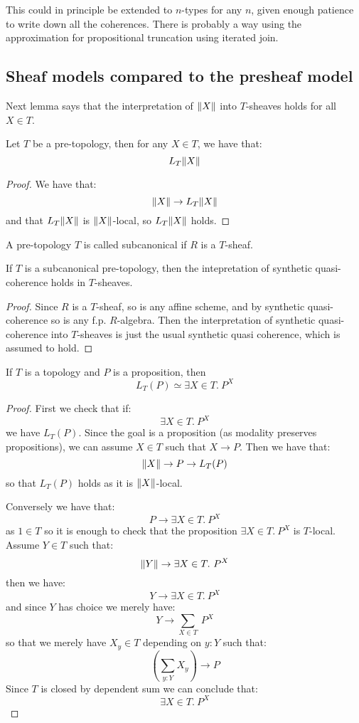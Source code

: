 This could in principle be extended to $n$-types for any $n$, given enough patience to write down all the coherences. There is probably a way using the approximation for propositional truncation using iterated join.

\subsection{Sheaf models compared to the presheaf model}

Next lemma says that the interpretation of $\lVert X \rVert$ into $T$-sheaves holds for all $X\in T$.

\begin{lemma}\label{sheaves-inhabited}
Let $T$ be a pre-topology, then for any $X\in T$, we have that:
\[L_T\lVert X \rVert\]
\end{lemma}

\begin{proof}
We have that: 
\[\lVert X \rVert\to L_T\lVert X \rVert\]
and that $L_T\lVert X \rVert$ is $\lVert X \rVert$-local, so $L_T\lVert X \rVert$ holds.
\end{proof}

\begin{definition}
A pre-topology $T$ is called subcanonical if $R$ is a $T$-sheaf.
\end{definition}

\begin{lemma}\label{sheaves-quasi-coherent}
If $T$ is a subcanonical pre-topology, then the intepretation of synthetic quasi-coherence holds in $T$-sheaves.
\end{lemma}

\begin{proof}
Since $R$ is a $T$-sheaf, so is any affine scheme, and by synthetic quasi-coherence so is any f.p. $R$-algebra. Then the interpretation of synthetic quasi-coherence into $T$-sheaves is just the usual synthetic quasi coherence, which is assumed to hold.
\end{proof}

\begin{lemma}\label{sheaf-replacement-proposition}
If $T$ is a topology and $P$ is a proposition, then 
\[L_T(P) \simeq \exists X\in T.\ P^X\]
\end{lemma}

\begin{proof}
First we check that if: 
\[\exists X\in T.\ P^X\]
we have $L_T(P)$. Since the goal is a proposition (as modality preserves propositions), we can assume $X\in T$ such that $X\to P$. Then we have that: 
\[\lVert X \rVert\to P\to L_T(P)\] 
so that $L_T(P)$ holds as it is $\lVert X \rVert$-local.

Conversely we have that:
\[P \to \exists X\in T.\ P^X\] 
as $1\in T$ so it is enough to check that the proposition $\exists X\in T.\ P^X$ is $T$-local. Assume $Y\in T$ such that:
\[\lVert Y \rVert \to \exists X\in T.\ P^X\] 
then we have:
\[Y \to \exists X\in T.\ P^X\] 
and since $Y$ has choice we merely have:
\[Y \to \sum_{X\in T}\ P^X\] 
so that we merely have $X_y\in T$ depending on $y:Y$ such that:
\[(\sum_{y:Y}X_y) \to P\]
Since $T$ is closed by dependent sum we can conclude that:
\[\exists X\in T.\ P^X\] 
\end{proof}

